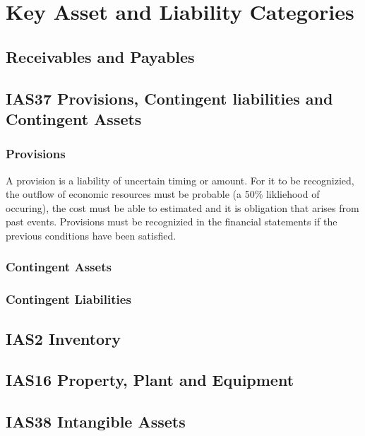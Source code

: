 \section{Key Asset and Liability Categories}

\subsection{Receivables and Payables}


\subsection{IAS37 Provisions, Contingent liabilities and Contingent Assets}

\subsubsection{Provisions}

A provision is a liability of uncertain timing or amount. For it to be recognizied, the outflow of economic resources must be probable (a 50\% likliehood of occuring), the cost must be able to estimated and it is obligation that arises from past 
events. Provisions must be recognizied in the financial statements if the previous conditions have been satisfied. 
 

\subsubsection{Contingent Assets}


\subsubsection{Contingent Liabilities}
\subsection{IAS2 Inventory} 


\subsection{IAS16 Property, Plant and Equipment}


\subsection{IAS38 Intangible Assets}
